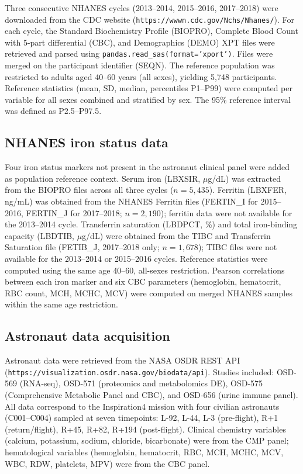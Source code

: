 \documentclass[11pt,a4paper]{article}
\begin{document}
Three consecutive NHANES cycles (2013--2014, 2015--2016, 2017--2018) were downloaded from the CDC website (\texttt{https://wwwn.cdc.gov/Nchs/Nhanes/}). For each cycle, the Standard Biochemistry Profile (BIOPRO), Complete Blood Count with 5-part differential (CBC), and Demographics (DEMO) XPT files were retrieved and parsed using \texttt{pandas.read\_sas(format='xport')}. Files were merged on the participant identifier (SEQN). The reference population was restricted to adults aged 40--60 years (all sexes), yielding 5,748 participants. Reference statistics (mean, SD, median, percentiles P1--P99) were computed per variable for all sexes combined and stratified by sex. The 95\% reference interval was defined as P2.5--P97.5.

\subsection{NHANES iron status data}

Four iron status markers not present in the astronaut clinical panel were added as population reference context. Serum iron (LBXSIR, $\mu$g/dL) was extracted from the BIOPRO files across all three cycles ($n = 5{,}435$). Ferritin (LBXFER, ng/mL) was obtained from the NHANES Ferritin files (FERTIN\_I for 2015--2016, FERTIN\_J for 2017--2018; $n = 2{,}190$); ferritin data were not available for the 2013--2014 cycle. Transferrin saturation (LBDPCT, \%) and total iron-binding capacity (LBDTIB, $\mu$g/dL) were obtained from the TIBC and Transferrin Saturation file (FETIB\_J, 2017--2018 only; $n = 1{,}678$); TIBC files were not available for the 2013--2014 or 2015--2016 cycles. Reference statistics were computed using the same age 40--60, all-sexes restriction. Pearson correlations between each iron marker and six CBC parameters (hemoglobin, hematocrit, RBC count, MCH, MCHC, MCV) were computed on merged NHANES samples within the same age restriction.

\subsection{Astronaut data acquisition}

Astronaut data were retrieved from the NASA OSDR REST API (\texttt{https://visualization.osdr.nasa.gov/biodata/api}). Studies included: OSD-569 (RNA-seq), OSD-571 (proteomics and metabolomics DE), OSD-575 (Comprehensive Metabolic Panel and CBC), and OSD-656 (urine immune panel). All data correspond to the Inspiration4 mission with four civilian astronauts (C001--C004) sampled at seven timepoints: L-92, L-44, L-3 (pre-flight), R+1 (return/flight), R+45, R+82, R+194 (post-flight). Clinical chemistry variables (calcium, potassium, sodium, chloride, bicarbonate) were from the CMP panel; hematological variables (hemoglobin, hematocrit, RBC, MCH, MCHC, MCV, WBC, RDW, platelets, MPV) were from the CBC panel.
\end{document}
